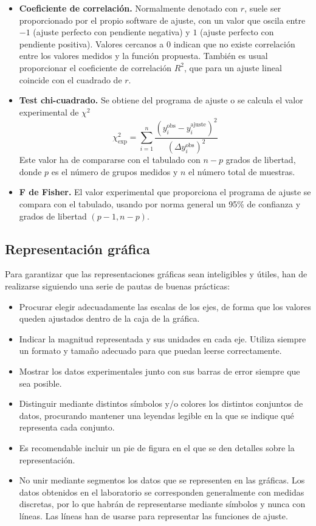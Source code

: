 \documentclass{book}
\begin{document}
\begin{itemize}
  \item \textbf{Coeficiente de correlación.} Normalmente denotado con $r$, suele ser proporcionado
  por el propio software de ajuste, con un valor que oscila entre $-1$ (ajuste perfecto con
  pendiente negativa) y $1$ (ajuste perfecto con pendiente positiva). Valores cercanos a $0$ 
  indican que no existe correlación entre los valores medidos y la función propuesta.
  También es usual proporcionar el coeficiente de correlación $R^2$, que para un ajuste lineal 
  coincide con el cuadrado de $r$.
  \item \textbf{Test chi-cuadrado.} Se obtiene del programa de ajuste o se calcula el valor
  experimental de $\chi^2$
  \begin{equation}
    \chi_{\textrm{exp}}^2 = \sum_{i=1}^n \frac{(y_i^{\textrm{obs}} - y_i^{\textrm{ajuste}})^2}{(\Delta y_i^{\textrm{obs}})^2}
  \end{equation}
  Este valor ha de compararse con el tabulado con $n-p$ grados de libertad,
  donde $p$ es el número de grupos medidos y $n$ el número total de muestras.
  \item \textbf{F de Fisher.} El valor experimental que proporciona el programa de ajuste se compara
  con el tabulado, usando por norma general un 95\% de confianza y grados de libertad $(p-1, n-p)$.
\end{itemize}


\subsection{Representación gráfica}
Para garantizar que las representaciones gráficas sean inteligibles y útiles, han de realizarse 
siguiendo una serie de pautas de buenas prácticas:

\begin{itemize}
  \item Procurar elegir adecuadamente las escalas de los ejes, de forma que los valores queden
  ajustados dentro de la caja de la gráfica.
  \item Indicar la magnitud representada y sus unidades en cada eje. Utiliza siempre un formato y
  tamaño adecuado para que puedan leerse correctamente.
  \item Mostrar los datos experimentales junto con sus barras de error siempre que sea posible.
  \item Distinguir mediante distintos símbolos y/o colores los distintos conjuntos de datos,
  procurando mantener una leyendas legible en la que se indique qué representa cada conjunto.
  \item Es recomendable incluir un pie de figura en el que se den detalles sobre la representación.
  \item No unir mediante segmentos los datos que se representen en las gráficas. Los datos obtenidos
  en el laboratorio se corresponden generalmente con medidas discretas, por lo que habrán de representarse
  mediante símbolos y nunca con líneas. Las líneas han de usarse para representar las funciones de
  ajuste.
\end{itemize}
\end{document}
